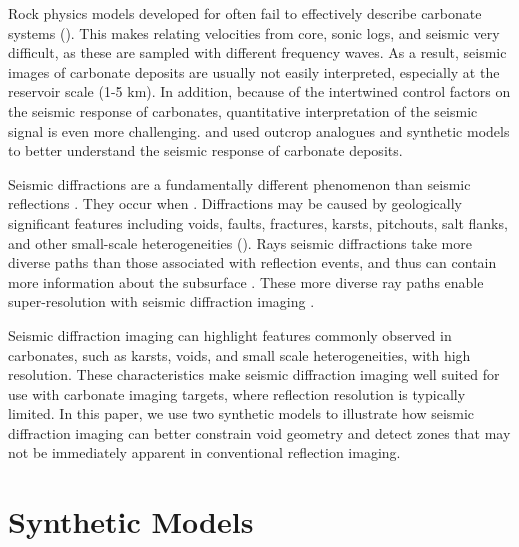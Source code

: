 \par
Rock physics models developed for  often fail to effectively describe carbonate systems (\citealp{sayers,bae}). This makes relating velocities from core, sonic logs, and seismic very difficult, as these are sampled with different frequency waves.  As a result, seismic images of carbonate deposits are usually not easily interpreted, especially at the reservoir scale (1-5 km). In addition, because of the intertwined control factors on the seismic response of carbonates, quantitative interpretation of the seismic signal is even more challenging. \cite{janson2010} and \cite{janson2011} used outcrop analogues and synthetic models  to better understand the seismic response of carbonate deposits.
\par
{}   Seismic diffractions are a fundamentally different phenomenon than seismic reflections \cite[]{klem}.  They occur when  .  Diffractions may be caused by geologically significant features including voids, faults, fractures, karsts, pitchouts, salt flanks, and other small-scale heterogeneities (\citealp[]{harl, khadi, fomel2, moser, klokov}).  Rays  seismic diffractions take more diverse paths than those associated with reflection events, and thus can contain more information about the subsurface \cite[]{neidell}.  These more diverse ray paths enable super-resolution with seismic diffraction imaging \cite[]{khadi}.
\par
Seismic diffraction imaging can highlight features commonly observed in carbonates, such as karsts, voids, and small scale heterogeneities, with high resolution.  These characteristics make seismic diffraction imaging well suited for use with carbonate imaging targets, where reflection resolution is typically limited.  In this paper, we use two synthetic models to illustrate how seismic diffraction imaging can better constrain void geometry and detect  zones that may not be immediately apparent in conventional reflection imaging.


\section{Synthetic Models}
